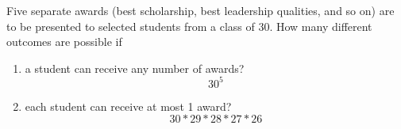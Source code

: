 \item Five separate awards (best scholarship, best leadership qualities, and so on) are to be presented to selected students from a class of 30. How many different outcomes are possible if
\begin{enumerate}
    \item a student can receive any number of awards?
    \[ 30^5 \]
    \item each student can receive at most 1 award?
    \[ 30 * 29 * 28 * 27 * 26 \]
\end{enumerate}

